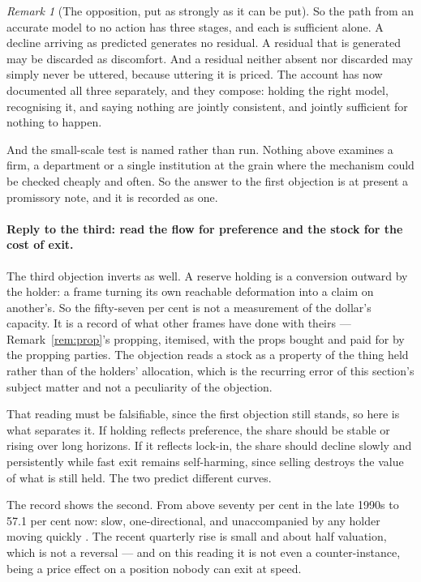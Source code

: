 \documentclass[11pt,a4paper]{article}
\theoremstyle{remark}
\newtheorem{remark}[definition]{Remark}
\begin{document}
\begin{remark}[The opposition, put as strongly as it can be put]
So the path from an accurate model to no action has three stages, and each is sufficient alone. A
decline arriving as predicted generates no residual. A residual that is generated may be discarded as
discomfort. And a residual neither absent nor discarded may simply never be uttered, because
uttering it is priced. The account has now documented all three separately, and they compose:
holding the right model, recognising it, and saying nothing are jointly consistent, and jointly
sufficient for nothing to happen.

And the small-scale test is named rather than run. Nothing above examines a firm, a department or
a single institution at the grain where the mechanism could be checked cheaply and often. So the
answer to the first objection is at present a promissory note, and it is recorded as one.

\paragraph{Reply to the third: read the flow for preference and the stock for the cost of exit.}
The third objection inverts as well. A reserve holding
is a conversion outward by the holder: a frame turning its own reachable deformation into a claim
on another's. So the fifty-seven per cent is not a measurement of the dollar's capacity. It is a
record of what other frames have done with theirs --- Remark~\ref{rem:prop}'s propping, itemised, with
the props bought and paid for by the propping parties. The objection reads a stock as a property
of the thing held rather than of the holders' allocation, which is the recurring error of this
section's subject matter and not a peculiarity of the objection.

That reading must be falsifiable, since the first objection still stands, so here is what
separates it. If holding reflects preference, the share should be stable or rising over long horizons.
If it reflects lock-in, the share should decline slowly and persistently while fast exit remains
self-harming, since selling destroys the value of what is still held. The two predict different
curves.

The record shows the second. From above seventy per cent in the late 1990s to 57.1 per cent
now: slow, one-directional, and unaccompanied by any holder moving quickly \citep{cofer2026}. The recent
quarterly rise is small and about half valuation, which is not a reversal --- and on this reading
it is not even a counter-instance, being a price effect on a position nobody can exit at speed.


\end{remark}
\end{document}
